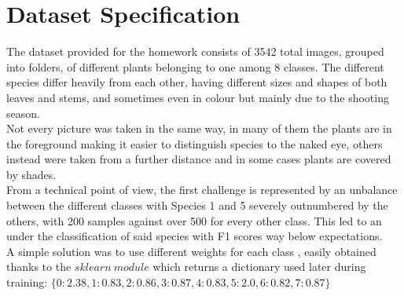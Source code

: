 \section {Dataset Specification}
The dataset provided for the homework consists of 3542 total images, grouped into folders, of different plants belonging to one among 8 classes. The different species differ heavily from each other, having different sizes and shapes of both leaves and stems, and sometimes even in colour but mainly due to the shooting season.\\
Not every picture was taken in the same way, in many of them the plants are in the foreground making it easier to distinguish species to the naked eye, others instead were taken from a further distance and in some cases plants are covered by shades.\\
From a technical point of view, the first challenge is represented by an unbalance between the different classes with Species 1 and 5 severely outnumbered by the others, with 200 samples against over 500 for every other class. This led to an under the classification of said species with F1 scores way below expectations.\\
A simple solution was to use different weights for each class \cite{class_weights}, easily obtained thanks to the $sklearn\ module$ which returns a dictionary used later during training:
$\{0: 2.38, 1: 0.83, 2: 0.86, 3: 0.87, 4: 0.83, 5: 2.0, 6: 0.82, 7: 0.87\}$
